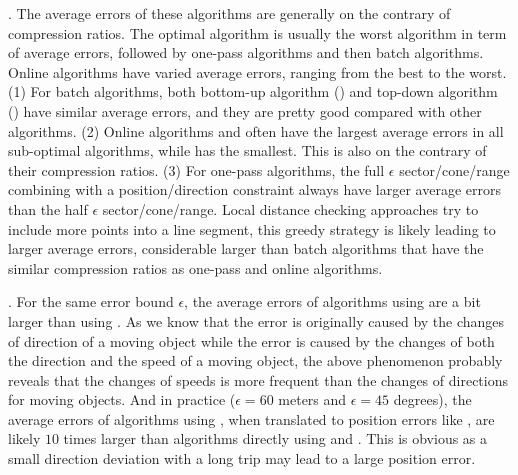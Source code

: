 . The average errors of these algorithms  are generally on the contrary of compression ratios. The optimal algorithm is usually  the worst algorithm in term of average errors, followed by one-pass algorithms and then batch algorithms.
Online algorithms have varied average errors, ranging from the best to the worst.
(1) For batch algorithms, both bottom-up algorithm (\tpa) and top-down algorithm (\dpa) have similar average errors, and they are pretty good compared with other algorithms.
%
(2) Online algorithms \bqsa and \opwa often have the largest average errors in all sub-optimal algorithms, while \squishe has the smallest. This is also on the contrary of their compression ratios.
%
(3) For one-pass algorithms, the full $\epsilon$ sector/cone/range combining with a position/direction constraint always have larger average errors than the half $\epsilon$ sector/cone/range.
%
Local distance checking approaches try to include more points into a line segment, this greedy strategy is likely leading to larger average errors, considerable larger than batch algorithms that have the similar compression ratios as one-pass and online algorithms.


.
For the same error bound $\epsilon$, the average errors of algorithms using \sed are a bit larger than using \ped. {As we know that the \ped error is originally caused by the changes of direction of a moving object while the \sed error is caused by the changes of both the direction and the speed of a moving object, the above phenomenon probably reveals that the changes of speeds is more frequent than the changes of directions for moving objects.}
%
And in practice (\eg $\epsilon = 60$ meters and $\epsilon = 45$ degrees), the average errors of algorithms using \dad, when translated to position errors like \ped, are likely $10$ times larger than algorithms directly using \ped and \sed. This is obvious as a small direction deviation with a long trip may lead to a large position error.





